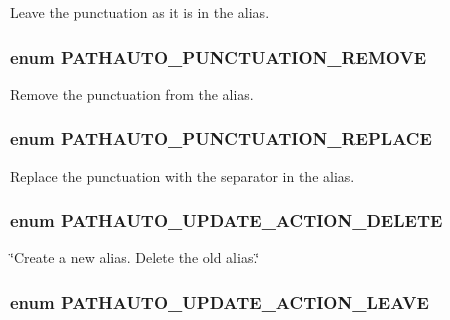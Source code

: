 \label{pathauto_8inc_a2b584fde6bb4b7c7fb17c3e2f9ca3b65}
Leave the punctuation as it is in the alias. \hypertarget{pathauto_8inc_af1defa37ae4d736ee2fd0701548faa6a}{
\subsubsection[{PATHAUTO\_\-PUNCTUATION\_\-REMOVE}]{\setlength{\rightskip}{0pt plus 5cm}enum {\bf PATHAUTO\_\-PUNCTUATION\_\-REMOVE}}}
\label{pathauto_8inc_af1defa37ae4d736ee2fd0701548faa6a}
Remove the punctuation from the alias. \hypertarget{pathauto_8inc_adad4cad26590ba34578f8f5e8e77e2de}{
\subsubsection[{PATHAUTO\_\-PUNCTUATION\_\-REPLACE}]{\setlength{\rightskip}{0pt plus 5cm}enum {\bf PATHAUTO\_\-PUNCTUATION\_\-REPLACE}}}
\label{pathauto_8inc_adad4cad26590ba34578f8f5e8e77e2de}
Replace the punctuation with the separator in the alias. \hypertarget{pathauto_8inc_a54c9ce36014ab76dfc253cc8a4b0846b}{
\subsubsection[{PATHAUTO\_\-UPDATE\_\-ACTION\_\-DELETE}]{\setlength{\rightskip}{0pt plus 5cm}enum {\bf PATHAUTO\_\-UPDATE\_\-ACTION\_\-DELETE}}}
\label{pathauto_8inc_a54c9ce36014ab76dfc253cc8a4b0846b}
\char`\"{}Create a new alias. Delete the old alias.\char`\"{} \hypertarget{pathauto_8inc_ad0bb9837044c24b6f3c0f4b2cd66c94b}{
\subsubsection[{PATHAUTO\_\-UPDATE\_\-ACTION\_\-LEAVE}]{\setlength{\rightskip}{0pt plus 5cm}enum {\bf PATHAUTO\_\-UPDATE\_\-ACTION\_\-LEAVE}}}
